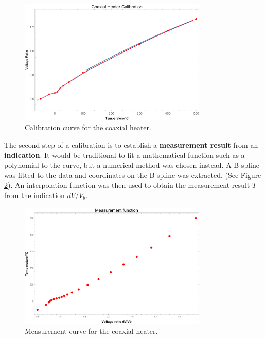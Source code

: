 \begin{figure}[htpb]
	\centering
	\includegraphics[width=0.8\textwidth]{Figures/2019_07_12_B-spline_fit_CPlot.pdf}
	\decoRule
	\caption[Calibration curve of the coaxial heater]{Calibration curve for the coaxial heater.}	
	\label{fig:CalibrationCurve}
\end{figure}

The second step of a calibration is to establish a \textbf{measurement result}
from an \textbf{indication}. It would be traditional to fit a mathematical
function such as a polynomial to the curve, but a numerical method was chosen
instead. A B-spline was fitted to the data and coordinates on the
B-spline was extracted. (See Figure \ref{fig:MeasurementCurve}). An
interpolation function was then used to obtain the measurement result \(T\) from
the indication \(dV/V_b\).

\begin{figure}
	\centering
	\includegraphics[width=0.8\textwidth]{Figures/2019_07_12_B-spline_fit_PPlot.pdf}
	\decoRule
	\caption[Measurement curve of the coaxial heater]{Measurement curve for the coaxial heater.}	
	\label{fig:MeasurementCurve}
\end{figure}

